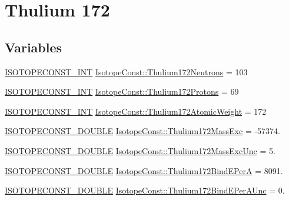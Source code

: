 \hypertarget{group___isotope_const-_thulium-_tm172}{}\section{Thulium 172}
\label{group___isotope_const-_thulium-_tm172}
\subsection*{Variables}
\begin{DoxyCompactItemize}
\item 
\mbox{\hyperlink{group___isotope_const-_macros_ga5f18360b3e99483a35c32d789e62621c}{I\+S\+O\+T\+O\+P\+E\+C\+O\+N\+S\+T\+\_\+\+I\+NT}} \mbox{\hyperlink{group___isotope_const-_thulium-_tm172_ga386cca7c781130a98e053e5300a37e1c}{Isotope\+Const\+::\+Thulium172\+Neutrons}} = 103
\item 
\mbox{\hyperlink{group___isotope_const-_macros_ga5f18360b3e99483a35c32d789e62621c}{I\+S\+O\+T\+O\+P\+E\+C\+O\+N\+S\+T\+\_\+\+I\+NT}} \mbox{\hyperlink{group___isotope_const-_thulium-_tm172_ga11236858d6d451ecfa4610dfddbfc895}{Isotope\+Const\+::\+Thulium172\+Protons}} = 69
\item 
\mbox{\hyperlink{group___isotope_const-_macros_ga5f18360b3e99483a35c32d789e62621c}{I\+S\+O\+T\+O\+P\+E\+C\+O\+N\+S\+T\+\_\+\+I\+NT}} \mbox{\hyperlink{group___isotope_const-_thulium-_tm172_ga8a2a6624e27cac3203a50ce6e9a23d0c}{Isotope\+Const\+::\+Thulium172\+Atomic\+Weight}} = 172
\item 
\mbox{\hyperlink{group___isotope_const-_macros_ga8f45a7272ce02c0b4c65c44636ed719a}{I\+S\+O\+T\+O\+P\+E\+C\+O\+N\+S\+T\+\_\+\+D\+O\+U\+B\+LE}} \mbox{\hyperlink{group___isotope_const-_thulium-_tm172_ga43154eb1f3d811ba2c2a049ab6e092f0}{Isotope\+Const\+::\+Thulium172\+Mass\+Exc}} = -\/57374.
\item 
\mbox{\hyperlink{group___isotope_const-_macros_ga8f45a7272ce02c0b4c65c44636ed719a}{I\+S\+O\+T\+O\+P\+E\+C\+O\+N\+S\+T\+\_\+\+D\+O\+U\+B\+LE}} \mbox{\hyperlink{group___isotope_const-_thulium-_tm172_gac83f9b99c2015348031c79bd7b6cad2f}{Isotope\+Const\+::\+Thulium172\+Mass\+Exc\+Unc}} = 5.
\item 
\mbox{\hyperlink{group___isotope_const-_macros_ga8f45a7272ce02c0b4c65c44636ed719a}{I\+S\+O\+T\+O\+P\+E\+C\+O\+N\+S\+T\+\_\+\+D\+O\+U\+B\+LE}} \mbox{\hyperlink{group___isotope_const-_thulium-_tm172_ga67beb85eaf843e9ea9dde310f766ba76}{Isotope\+Const\+::\+Thulium172\+Bind\+E\+PerA}} = 8091.
\item 
\mbox{\hyperlink{group___isotope_const-_macros_ga8f45a7272ce02c0b4c65c44636ed719a}{I\+S\+O\+T\+O\+P\+E\+C\+O\+N\+S\+T\+\_\+\+D\+O\+U\+B\+LE}} \mbox{\hyperlink{group___isotope_const-_thulium-_tm172_ga4ff49857454d2a453ffc3bd9235e2fcd}{Isotope\+Const\+::\+Thulium172\+Bind\+E\+Per\+A\+Unc}} = 0.

\end{DoxyCompactItemize}
